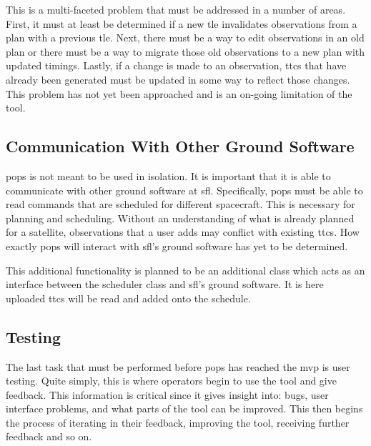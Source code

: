 This is a multi-faceted problem that must be addressed in a number of areas.
First, it must at least be determined if a new \gls{tle} invalidates
observations from a plan with a previous \gls{tle}. Next, there must be a way
to edit observations in an old plan or there must be a way to migrate those old
observations to a new plan with updated timings. Lastly, if a change is made to
an observation, \glspl{ttc} that have already been generated must be updated in
some way to reflect those changes. This problem has not yet been approached and
is an on-going limitation of the tool.


\subsection{Communication With Other Ground Software}

\gls{pops} is not meant to be used in isolation. It is important that it is
able to communicate with other ground software at \gls{sfl}. Specifically,
\gls{pops} must be able to read commands that are scheduled for different
spacecraft. This is necessary for planning and scheduling.  Without an
understanding of what is already planned for a satellite, observations that a
user adds may conflict with existing \glspl{ttc}.  How exactly \gls{pops} will
interact with \gls{sfl}'s ground software has yet to be determined.  

This additional functionality is planned to be an additional class which acts
as an interface between the scheduler class and \gls{sfl}'s ground software. It
is here uploaded \glspl{ttc} will be read and added onto the schedule.



\subsection{Testing}

The last task that must be performed before \gls{pops} has reached the
\gls{mvp} is user testing. Quite simply, this is where operators begin to use
the tool and give feedback. This information is critical since it gives insight
into: bugs, user interface problems, and what parts of the tool can be
improved.  This then begins the process of iterating in their feedback,
improving the tool, receiving further feedback and so on.


